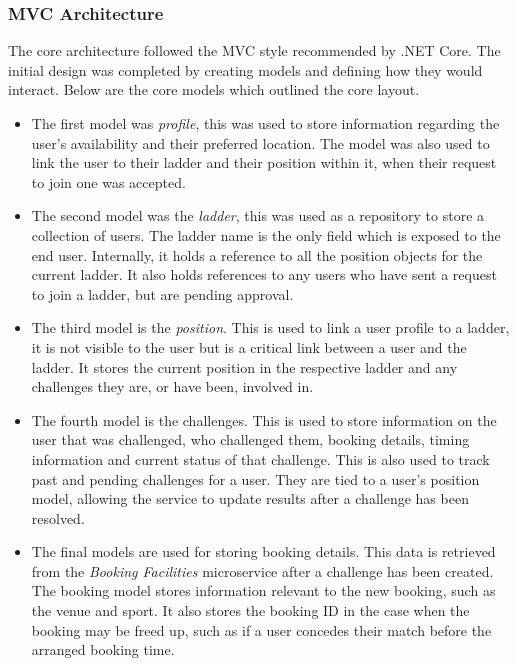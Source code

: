 \subsubsection{MVC Architecture}
\par
The core architecture followed the MVC style recommended by .NET Core. The initial design was completed by creating models and defining how they would interact. Below are the core models which outlined the core layout.

\begin{itemize}

	\item The first model was \textit{profile}, this was used to store information regarding the user's availability and their preferred location. The model was also used to link the user to their ladder and their position within it, when their request to join one was accepted.

	\item The second model was the \textit{ladder}, this was used as a repository to store a collection of users. The ladder name is the only field which is exposed to the end user. Internally, it holds a reference to all the position objects for the current ladder. It also holds references to any users who have sent a request to join a ladder, but are pending approval.

	\item The third model is the \textit{position}. This is used to link a user profile to a ladder, it is not visible to the user but is a critical link between a user and the ladder. It stores the current position in the respective ladder and any challenges they are, or have been, involved in.

	\item The fourth model is the challenges. This is used to store information on the user that was challenged, who challenged them, booking details, timing information and current status of that challenge. This is also used to track past and pending challenges for a user. They are tied to a user’s position model, allowing the service to update results after a challenge has been resolved.

	\item The final models are used for storing booking details. This data is retrieved from the \textit{Booking Facilities} microservice after a challenge has been created. The booking model stores information relevant to the new booking, such as the venue and sport. It also stores the booking ID in the case when the booking may be freed up, such as if a user concedes their match before the arranged booking time.

\end{itemize}

